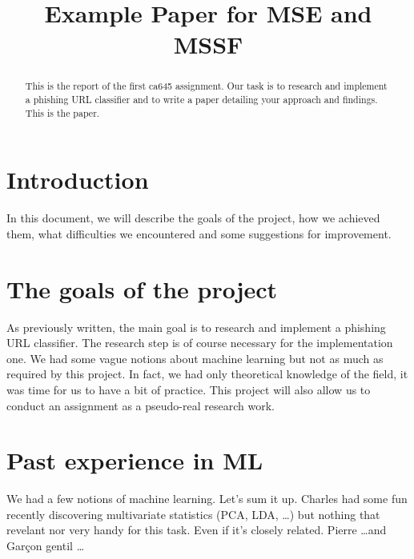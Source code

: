 \documentclass[conference,11pt]{IEEEtran}
\begin{document}
\title{Example Paper for MSE and MSSF}

\author{
\and
{}
\and
{}
}

\maketitle

\begin{abstract}
This is the report of the first ca645 assignment. Our task is to research and
implement a phishing URL classifier and to write a paper detailing your approach
and findings. This is the paper.
\end{abstract}

\section{Introduction}
In this document, we will describe the goals of the project, how we achieved
them, what difficulties we encountered and some suggestions for improvement.

\section{The goals of the project}
As previously written, the main goal is to research and implement a phishing URL
classifier. The research step is of course necessary for the implementation one.
We had some vague notions about machine learning but not as much as required by
this project. In fact, we had only theoretical knowledge of the field, it was
time for us to have a bit of practice. This project will also allow us to
conduct an assignment as a pseudo-real research work.

\section{Past experience in ML}
We had a few notions of machine learning. Let's sum it up. Charles had some fun
recently discovering multivariate statistics (PCA, LDA, \ldots) but nothing that
revelant nor very handy for this task. Even if it's closely related. Pierre
\ldots and Garçon gentil \ldots
\end{document}
